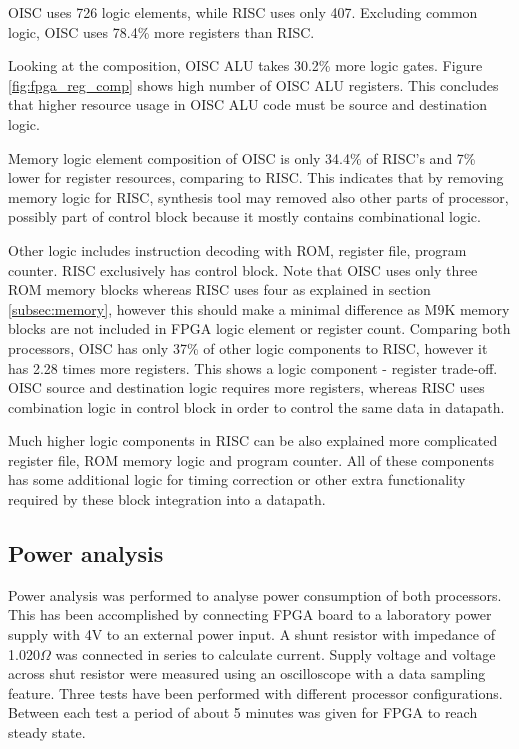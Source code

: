 OISC uses 726 logic elements, while RISC uses only 407. Excluding common logic, OISC uses 78.4\% more registers than RISC.

Looking at the composition, OISC ALU takes 30.2\% more logic gates. Figure \ref{fig:fpga_reg_comp} shows high number of OISC ALU registers. This concludes that higher resource usage in OISC ALU code must be source and destination logic.

Memory logic element composition of OISC is only 34.4\% of RISC's and 7\% lower for register resources, comparing to RISC. This indicates that by removing memory logic for RISC, synthesis tool may removed also other parts of processor, possibly part of control block because it mostly contains combinational logic.

Other logic includes instruction decoding with ROM, register file, program counter. RISC exclusively has control block. Note that OISC uses only three ROM memory blocks whereas RISC uses four as explained in section \ref{subsec:memory}, however this should make a minimal difference as M9K memory blocks are not included in FPGA logic element or register count. Comparing both processors, OISC has only 37\% of other logic components to RISC, however it has 2.28 times more registers. This shows a logic component - register trade-off. OISC source and destination logic requires more registers, whereas RISC uses combination logic in control block in order to control the same data in datapath. 

Much higher logic components in RISC can be also explained more complicated register file, ROM memory logic and program counter. All of these components has some additional logic for timing correction or other extra functionality required by these block integration into a datapath.

\subsection{Power analysis}

Power analysis was performed to analyse power consumption of both processors.
This has been accomplished by connecting FPGA board to a laboratory power supply with 4V to an external power input. A shunt resistor with impedance of 1.020$\Omega$ was connected in series to calculate current. Supply voltage and voltage across shut resistor were measured using an oscilloscope with a data sampling feature. Three tests have been performed with different processor configurations. Between each test a period of about 5 minutes was given for FPGA to reach steady state. 


